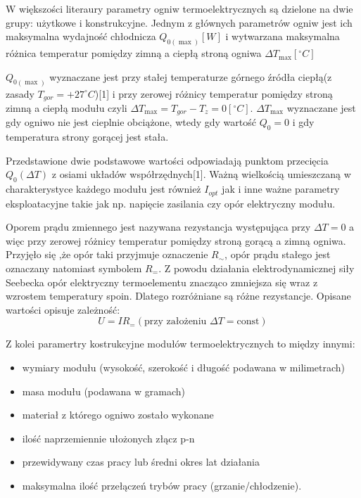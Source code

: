 \documentclass[oneside]{mgr}
\begin{document}
W większości literaury parametry ogniw termoelektrycznych są dzielone na dwie grupy: użytkowe i konstrukcyjne. Jednym z głównych parametrów ogniw jest ich maksymalna wydajność chłodnicza $Q_{0(\max)} [W]$ i wytwarzana maksymalna różnica temperatur pomiędzy zimną a ciepłą stroną ogniwa $\Delta T_{\max} [^{\circ} C]$

$Q_{0(\max)}$ wyznaczane jest przy stałej temperaturze górnego źródła ciepłą(z zasady $T_{gor}=+27^\circ C$)[1] i przy zerowej różnicy temperatur pomiędzy stroną zimną a ciepłą modułu czyli $\Delta T_{\max} = T_{gor} - T_z = 0 [^{\circ} C]$. $\Delta T_{\max}$ wyznaczane jest gdy ogniwo nie jest cieplnie obciążone, wtedy gdy wartość $Q_0 = 0$ i gdy temperatura strony gorącej jest stała.

Przedstawione dwie podstawowe wartości odpowiadają punktom przecięcia $Q_0 (\Delta T)$ z osiami układów współrzędnych[1]. Ważną wielkością umieszczaną w charakterystyce każdego modułu jest również $I_{opt}$ jak i inne ważne parametry eksploatacyjne takie jak np. napięcie zasilania czy opór elektryczny modułu.

Oporem prądu zmiennego jest nazywana rezystancja występująca przy $\Delta T = 0$ a więc przy zerowej różnicy temperatur pomiędzy stroną gorącą a zimną ogniwa. Przyjęło się ,że opór taki przyjmuje oznaczenie $R_\sim$, opór prądu stałego jest oznaczany natomiast symbolem $R_=$. Z powodu działania elektrodynamicznej siły Seebecka opór elektryczny termoelementu znacząco zmniejsza się wraz z wzrostem temperatury spoin. Dlatego rozróżniane są różne rezystancje. Opisane wartości opisuje zależność:
\begin{equation}
    U = IR_ = (\text{przy założeniu } \Delta T = \text{const})
\end{equation}

Z kolei paramertry kostrukcyjne modułów termoelektrycznych to między innymi:
\begin{itemize}
    \item wymiary modułu (wysokość, szerokość i długość podawana w milimetrach)
    \item masa modułu (podawana w gramach)
    \item materiał z którego ogniwo zostało wykonane
    \item ilość naprzemiennie ułożonych złącz p-n
    \item przewidywany czas pracy lub średni okres lat działania
    \item maksymalna ilość przełączeń trybów pracy (grzanie/chłodzenie).
\end{itemize}
\end{document}
